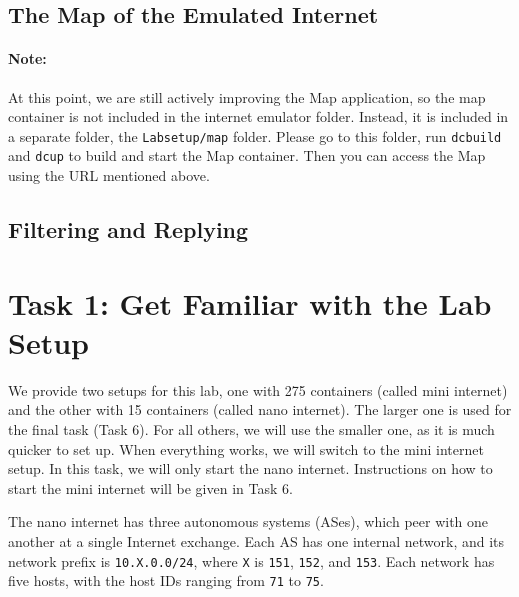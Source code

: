 \subsection{The Map of the Emulated Internet} 



\paragraph{Note:} At this point, we are still actively improving
the Map application, so the map container is not included 
in the internet emulator folder. Instead, it is included 
in a separate folder, the \texttt{Labsetup/map} folder. 
Please go to this folder, run \texttt{dcbuild} and \texttt{dcup}
to build and start the Map container. Then you can access the Map
using the URL mentioned above. 

\subsection{Filtering and Replying} 






\section{Task 1: Get Familiar with the Lab Setup } 

We provide two setups for this lab, 
one with 275 containers (called mini internet)
and the other with 15 containers (called nano internet).
The larger one is used for the final task (Task 6). For 
all others, we will use the smaller one, as it is much
quicker to set up. When everything works, we will
switch to the mini internet setup. In this task, we will
only start the nano internet. Instructions on how to 
start the mini internet will be given in Task 6.


The nano internet has three autonomous systems (ASes), 
which peer with one another at a single Internet exchange.
Each AS has one internal network, and 
its network prefix is \texttt{10.X.0.0/24}, 
where \texttt{X} is \texttt{151}, \texttt{152}, 
and \texttt{153}.  
Each network has five hosts, with the host IDs ranging from
\texttt{71} to \texttt{75}. 


